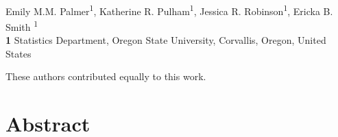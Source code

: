 \documentclass[10pt,letterpaper]{article}
\begin{document}
\vspace*{0.2in}

\begin{flushleft}
{\Large
\textbf{}
\textbf{} %
}
\newline
\\
Emily M.M. Palmer\textsuperscript{1\ddag},
Katherine R. Pulham\textsuperscript{1\ddag},
Jessica R. Robinson\textsuperscript{1\ddag},
Ericka B. Smith \textsuperscript{1\ddag}
\\
\bigskip
\textbf{1} Statistics Department, Oregon State University, Corvallis, Oregon, United States
\\
\bigskip

%
%

\ddag These authors contributed equally to this work.





\end{flushleft}
\section*{Abstract}
\end{document}
